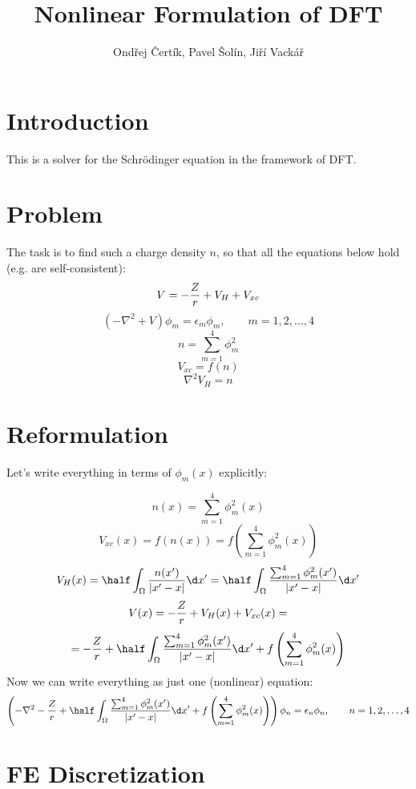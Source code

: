 \documentclass[11pt]{article}
\title{Nonlinear Formulation of DFT}
\author{Ondřej Čertík, Pavel Šolín, Jiří Vackář}
\begin{document}
\maketitle

\section{Introduction}

This is a solver for the Schr\"odinger equation in the framework of DFT.

\section{Problem}

The task is to find such a charge density $n$, so that all the equations below hold (e.g. are
self-consistent):
$$ V = -{Z\over r} + V_H + V_{xc} $$
$$
\left(-\nabla^2+V\right)\phi_m = \epsilon_m\phi_m,\quad\quad m = 1, 2, \dots, 4
$$
$$ n = \sum_{m=1}^4 \phi_m^2 $$
$$ V_{xc} = f(n) $$
$$ \nabla^2 V_H = n $$

\section{Reformulation}

Let's write everything in terms of $\phi_m(x)$ explicitly:

$$n(x) = %
\sum_{m=1}^4 \phi_m^2(x)$$
$$V_{xc}(x) = f(n(x)) = f\left( \sum_{m=1}^4\phi_m^2(x) \right)$$
$$V_H(x) = \half \int_\Omega {n(x')\over|x' - x|}\d x'=
\half \int_\Omega {
\sum_{m=1}^4 \phi_m^2(x')
\over|x' - x|}\d x'
$$
$$V(x) = -{Z\over r} + V_H(x) + V_{xc}(x)=$$
$$
=-{Z\over r}+
\half \int_\Omega {
\sum_{m=1}^4 \phi_m^2(x')
\over|x' - x|}\d x'
+f\left( \sum_{m=1}^4\phi_m^2(x) \right)
$$
Now we can write everything as just one (nonlinear)
equation:
$$
\left(-\nabla^2
-{Z\over r}+
\half \int_\Omega {
\sum_{m=1}^4 \phi_m^2(x')
\over|x' - x|}\d x'
+f\left( \sum_{m=1}^4\phi_m^2(x) \right)
\right)\phi_n = \epsilon_n\phi_n,\quad\quad n = 1, 2, \dots, 4
$$

\section{FE Discretization}
\end{document}
